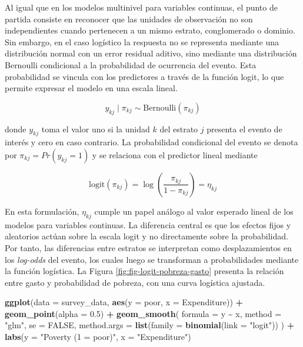\documentclass[
  spanish,
  12pt,
]{book}
\newenvironment{Shaded}{\begin{snugshade}}{\end{snugshade}}
\newcommand{\AttributeTok}[1]{\textcolor[rgb]{0.13,0.29,0.53}{#1}}
\newcommand{\ConstantTok}[1]{\textcolor[rgb]{0.56,0.35,0.01}{#1}}
\newcommand{\FloatTok}[1]{\textcolor[rgb]{0.00,0.00,0.81}{#1}}
\newcommand{\FunctionTok}[1]{\textcolor[rgb]{0.13,0.29,0.53}{\textbf{#1}}}
\newcommand{\NormalTok}[1]{#1}
\newcommand{\SpecialCharTok}[1]{\textcolor[rgb]{0.81,0.36,0.00}{\textbf{#1}}}
\newcommand{\StringTok}[1]{\textcolor[rgb]{0.31,0.60,0.02}{#1}}
\begin{document}
Al igual que en los modelos multinivel para variables continuas, el punto de partida consiste en reconocer que las unidades de observación no son independientes cuando pertenecen a un mismo estrato, conglomerado o dominio. Sin embargo, en el caso logístico la respuesta no se representa mediante una distribución normal con un error residual aditivo, sino mediante una distribución Bernoulli condicional a la probabilidad de ocurrencia del evento. Esta probabilidad se vincula con los predictores a través de la función logit, lo que permite expresar el modelo en una escala lineal.

\[
y_{kj} \mid \pi_{kj} \sim \text{Bernoulli}(\pi_{kj})
\]

donde \(y_{kj}\) toma el valor uno si la unidad \(k\) del estrato \(j\) presenta el evento de interés y cero en caso contrario. La probabilidad condicional del evento se denota por \(\pi_{kj}=Pr(y_{kj}=1)\) y se relaciona con el predictor lineal mediante

\[
\text{logit}(\pi_{kj}) =
\log\left(\frac{\pi_{kj}}{1-\pi_{kj}}\right)
= \eta_{kj}
\]

En esta formulación, \(\eta_{kj}\) cumple un papel análogo al valor esperado lineal de los modelos para variables continuas. La diferencia central es que los efectos fijos y aleatorios actúan sobre la escala logit y no directamente sobre la probabilidad. Por tanto, las diferencias entre estratos se interpretan como desplazamientos en los \emph{log-odds} del evento, los cuales luego se transforman a probabilidades mediante la función logística. La Figura \ref{fig:fig-logit-pobreza-gasto} presenta la relación entre gasto y probabilidad de pobreza, con una curva logística ajustada.

\begin{Shaded}
\begin{Highlighting}[]
\FunctionTok{ggplot}\NormalTok{(}\AttributeTok{data =}\NormalTok{ survey\_data,}
       \FunctionTok{aes}\NormalTok{(}\AttributeTok{y =}\NormalTok{ poor, }\AttributeTok{x =}\NormalTok{ Expenditure)) }\SpecialCharTok{+}
  \FunctionTok{geom\_point}\NormalTok{(}\AttributeTok{alpha =} \FloatTok{0.5}\NormalTok{) }\SpecialCharTok{+}
  \FunctionTok{geom\_smooth}\NormalTok{(}
    \AttributeTok{formula =}\NormalTok{ y }\SpecialCharTok{\textasciitilde{}}\NormalTok{ x,}
    \AttributeTok{method =} \StringTok{"glm"}\NormalTok{,}
    \AttributeTok{se =} \ConstantTok{FALSE}\NormalTok{,}
    \AttributeTok{method.args =} \FunctionTok{list}\NormalTok{(}\AttributeTok{family =} \FunctionTok{binomial}\NormalTok{(}\AttributeTok{link =} \StringTok{"logit"}\NormalTok{))}
\NormalTok{  ) }\SpecialCharTok{+}
  \FunctionTok{labs}\NormalTok{(}\AttributeTok{y =} \StringTok{"Poverty (1 = poor)"}\NormalTok{, }\AttributeTok{x =} \StringTok{"Expenditure"}\NormalTok{)}
\end{Highlighting}
\end{Shaded}
\end{document}
